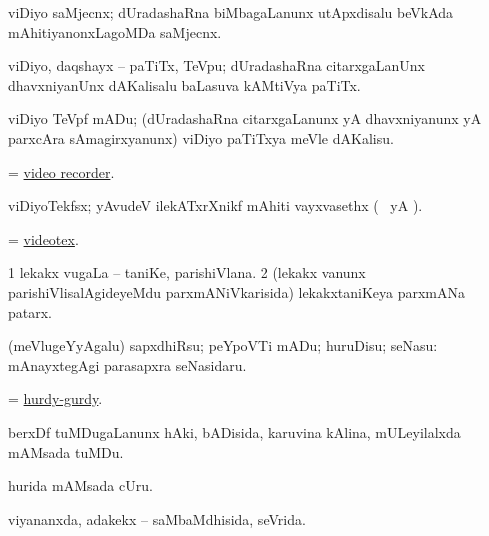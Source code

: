 \bentry
{} 
\gl{\nA}
\expl{}
\bmng
 viDiyo saMjecnx; dUradashaRna biMbagaLanunx utApxdisalu beVkAda mAhitiyanonxLagoMDa saMjecnx. 
\emng
\eentry

\bentry
   
\gl{\nA}
\expl{}
\bmng
 viDiyo, daqshayx -- paTiTx, TeVpu; dUradashaRna citarxgaLanUnx dhavxniyanUnx dAKalisalu baLasuva kAMtiVya paTiTx. 
\emng
\eentry

\bentry 
{} 
\gl{\sakirx}
\expl{}
\bmng
 viDiyo TeVpf mADu; (dUradashaRna citarxgaLanunx yA dhavxniyanunx yA parxcAra sAmagirxyanunx) viDiyo paTiTxya meVle dAKalisu. 
\emng
\eentry

\bentry
{}
\gl{\nA}
\expl{}
\bmng
 = \hyperlink{video recorder}{video recorder}. 
\emng
\eentry

\bentry
{} 
\gl{\nA}
\expl{}
\bmng
 viDiyoTekfsx; yAvudeV ilekATxrXnikf mAhiti vayxvasethx (\kanmu\  yA ). 
\emng
\eentry

\bentry
{} 
\gl{\nA}
\expl{}
\bmng
 = \hyperlink{videotex}{videotex}. 
\emng
\eentry

\bentry
{} 
\gl{\nA}
\expl{}
\bmng
\bnum
\num{1} lekakx \mo vugaLa -- taniKe, parishiVlana. 
\num{2} (lekakx \mo vanunx parishiVlisalAgideyeMdu parxmANiVkarisida) lekakxtaniKeya parxmANa patarx. 
\enum
\emng
\eentry

\bentry
{} 
\gl{\akirx}
\bmng
 (meVlugeYyAgalu) sapxdhiRsu; peYpoVTi mADu; huruDisu; seNasu:  mAnayxtegAgi parasapxra seNasidaru. 
\emng
\eentry

\bentry
{} 
\gl{\nA}
\expl{}
\bmng
 = \hyperref{kandict_h.pdf}{H}{hurdy-gurdy}{hurdy-gurdy}. 
\emng
\eentry

\bentry
{} 
\gl{\nA}
\expl{}
\bmng
 berxDf tuMDugaLanunx hAki, bADisida, karuvina kAlina, mULeyilalxda mAMsada tuMDu. 
\emng
\eentry

\bentry
{}
\gl{\nA}
\expl{}
\bmng
 hurida mAMsada cUru. 
\emng
\eentry

\bentry
{} 
\gl{\gu}
\expl{}
\bmng
 viyananxda, adakekx -- saMbaMdhisida, seVrida. 
\emng
\eentry

